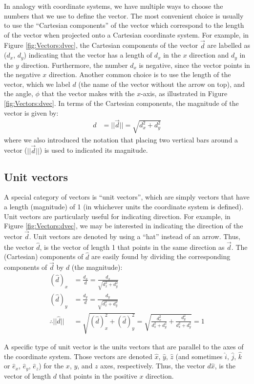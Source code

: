 In analogy with coordinate systems, we have multiple ways to choose the numbers that we use to define the vector. The most convenient choice is usually to use the ``Cartesian components'' of the vector which correspond to the length of the vector when projected onto a Cartesian coordinate system. For example, in Figure \ref{fig:Vectors:dvec}, the Cartesian components of the vector $\vec d$ are labelled as ($d_x$, $d_y$) indicating that the vector has a length of $d_x$ in the $x$ direction and $d_y$ in the $y$ direction. Furthermore, the number $d_x$ is negative, since the vector points in the negative $x$ direction. Another common choice is to use the length of the vector, which we label $d$ (the name of the vector without the arrow on top), and the angle, $\phi$ that the vector makes with the $x$-axis, as illustrated in Figure \ref{fig:Vectors:dvec}. In terms of the Cartesian components, the magnitude of the vector is given by:
\begin{align*}
d&= ||\vec d||= \sqrt{d_x^2+d_y^2}
\end{align*}
where we also introduced the notation that placing two vertical bars around a vector ($||\vec d||$) is used to indicated its magnitude.


\subsection{Unit vectors} 
A special category of vectors is ``unit vectors'', which are simply vectors that have a length (magnitude) of 1 (in whichever units the coordinate system is defined). Unit vectors are particularly useful for indicating direction. For example, in Figure \ref{fig:Vectors:dvec}, we may be interested in indicating the direction of the vector $\vec d$. Unit vectors are denoted by using a ``hat'' instead of an arrow. Thus, the vector $\hat d$, is the vector of length 1 that points in the same direction as $\vec d$. The (Cartesian) components of $\hat d$ are easily found by dividing the corresponding components of $\vec d$ by $d$ (the magnitude):
\begin{align*}
(\hat d)_x &= \frac{d_x}{d}=\frac{d_x}{\sqrt{d_x^2+d_y^2}}\\
(\hat d)_y &= \frac{d_y}{d}=\frac{d_y}{\sqrt{d_x^2+d_y^2}}\\
\therefore ||\hat d||&=\sqrt{(\hat d)_x^2+(\hat d)_y^2}=\sqrt{\frac{d_x^2}{d_x^2+d_y^2}+\frac{d_y^2}{d_x^2+d_y^2}}=1
\end{align*}

A specific type of unit vector is the units vectors that are parallel to the axes of the coordinate system. Those vectors are denoted $\hat x$, $\hat y$, $\hat z$ (and sometimes $\hat i$, $\hat j$, $\hat k$ or $\hat e_x$, $\hat e_y$, $\hat e_z$) for the $x$, $y$, and $z$ axes, respectively. Thus, the vector $d\hat{x}$, is the vector of length $d$ that points in the positive $x$ direction. 

